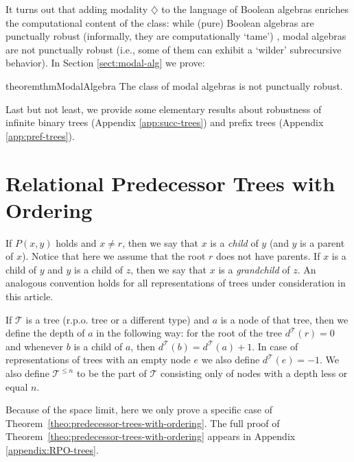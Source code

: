 \documentclass[a4paper,UKenglish,cleveref, autoref, thm-restate]{lipics-v2021}
\begin{document}
It turns out that adding modality $\diamondsuit$ to the language of Boolean algebras enriches the computational content of the class: while (pure) Boolean algebras are punctually robust (informally, they are computationally `tame') \cite{kalimullin_algebraic_2017}, modal algebras are not punctually robust (i.e., some of them can exhibit a `wilder' subrecursive behavior). In Section \ref{sect:modal-alg} we prove:
\begin{restatable}{theorem}{thmModalAlgebra}\label{theo:main-modal-algebra}
The class of modal algebras is not punctually robust.
\end{restatable}


Last but not least, we provide some elementary results about robustness of infinite binary trees (Appendix \ref{app:succ-trees}) and prefix trees (Appendix \ref{app:pref-trees}).







\section{Relational Predecessor Trees with Ordering}\label{sec:rpo}


If $P(x,y)$ holds and $x\neq r$, then we say that $x$ is a \emph{child} of $y$ (and $y$ is a parent of $x$). Notice that here we assume that the root $r$ does not have parents. If $x$ is a child of $y$ and $y$ is a child of $z$, then we say that $x$ is a \emph{grandchild} of $z$. An analogous convention holds for all representations of trees under consideration in this article.

\begin{definition}
    If $\mathcal{T}$ is a tree (r.p.o. tree or a different type) and $a$ is a node of that tree, then we define the depth of $a$ in the following way: for the root of the tree $d^{\mathcal{T}}(r)=0$ and whenever $b$ is a child of $a$, then $d^{\mathcal{T}}(b)=d^{\mathcal{T}}(a)+1$. In case of representations of trees with an empty node $e$ we also define $d^{\mathcal{T}}(e)=-1$. We also define $\mathcal{T}^{\leq n}$ to be the part of $\mathcal{T}$ consisting only of nodes with a depth less or equal $n$. 
\end{definition}


    Because of the space limit, here we only prove a specific case of Theorem~\ref{theo:predecessor-trees-with-ordering}. The full proof of Theorem~\ref{theo:predecessor-trees-with-ordering} appears in Appendix \ref{appendix:RPO-trees}.
\end{document}
